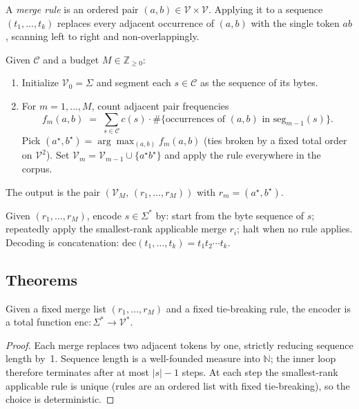 \begin{definition}
A \emph{merge rule} is an ordered pair $(a, b) \in \mathcal{V} \times \mathcal{V}$. Applying it to a sequence $(t_1, \dots, t_k)$ replaces every adjacent occurrence of $(a, b)$ with the single token $ab$, scanning left to right and non-overlappingly.
\end{definition}

\begin{definition}
Given $\mathcal{C}$ and a budget $M \in \mathbb{Z}_{\geq 0}$:
\begin{enumerate}
\item Initialize $\mathcal{V}_0 = \Sigma$ and segment each $s \in \mathcal{C}$ as the sequence of its bytes.
\item For $m = 1, \dots, M$, count adjacent pair frequencies
\[
f_m(a,b) \;=\; \sum_{s \in \mathcal{C}} c(s) \cdot \#\{\text{occurrences of }(a,b)\text{ in }\mathrm{seg}_{m-1}(s)\}.
\]
Pick $(a^\star, b^\star) = \arg\max_{(a,b)} f_m(a,b)$ (ties broken by a fixed total order on $\mathcal{V}^2$). Set $\mathcal{V}_m = \mathcal{V}_{m-1} \cup \{a^\star b^\star\}$ and apply the rule everywhere in the corpus.
\end{enumerate}
The output is the pair $(\mathcal{V}_M,\, (r_1, \dots, r_M))$ with $r_m = (a^\star, b^\star)$.
\end{definition}

\begin{definition}
Given $(r_1, \dots, r_M)$, encode $s \in \Sigma^*$ by: start from the byte sequence of $s$; repeatedly apply the smallest-rank applicable merge $r_i$; halt when no rule applies. Decoding is concatenation: $\mathrm{dec}(t_1, \dots, t_k) = t_1 t_2 \cdots t_k$.
\end{definition}

\subsection*{Theorems}

\begin{theorem}
Given a fixed merge list $(r_1, \dots, r_M)$ and a fixed tie-breaking rule, the encoder is a total function $\mathrm{enc}: \Sigma^* \to \mathcal{V}^*$.
\end{theorem}

\begin{proof}
Each merge replaces two adjacent tokens by one, strictly reducing sequence length by~1. Sequence length is a well-founded measure into $\mathbb{N}$; the inner loop therefore terminates after at most $|s|-1$ steps. At each step the smallest-rank applicable rule is unique (rules are an ordered list with fixed tie-breaking), so the choice is deterministic. \qedhere
\end{proof}

